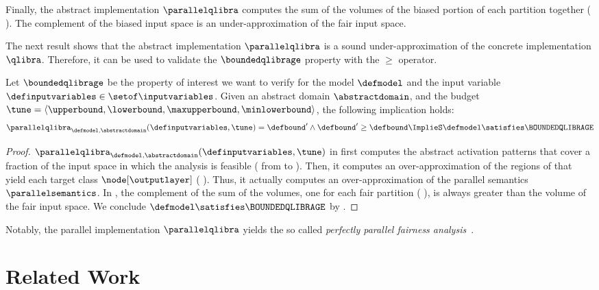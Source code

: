 {Finally, the abstract implementation $\parallelqlibra$ computes the sum of the volumes of the biased portion of each partition together (\cf{} ).
The complement of the biased input space is an under-approximation of the fair input space.

The next result shows that the abstract implementation $\parallelqlibra$ is a sound under-approximation of the concrete implementation $\qlibra$.
Therefore, it can be used to validate the $\boundedqlibrage$ property with the $\ge$ operator.

\begin{theorem}
  Let $\boundedqlibrage$ be the property of interest we want to verify for the model $\defmodel$ and the input variable $\definputvariables\in\setof\inputvariables$.
  Given an abstract domain $\abstractdomain$, and the budget $\tune = \langle \upperbound, \lowerbound, \maxupperbound, \minlowerbound\rangle$, the following implication holds:
  \begin{align*}
    \parallelqlibra_{\defmodel, \abstractdomain}(\definputvariables, \tune) = \defbound' \land \defbound' \ge \defbound \ImplieS \defmodel \satisfies \BOUNDEDQLIBRAGE
  \end{align*}
\end{theorem}
\begin{proof}
  $\parallelqlibra_{\defmodel, \abstractdomain}(\definputvariables, \tune)$ in  first computes the abstract activation patterns that cover a fraction \C{} of the input space in which the analysis is feasible (\cf{} from  to ).
  Then, it computes an over-approximation of the regions of \C{} that yield each target class $\node[\outputlayer]$ (\cf{} ).
  Thus, it actually computes an over-approximation of the parallel semantics $\parallelsemantics$.
  In , the complement of the sum of the volumes, one for each fair partition (\cf{} ), is always greater than the volume of the fair input space. We conclude $\defmodel \satisfies \BOUNDEDQLIBRAGE$ by .
\end{proof}

Notably, the parallel implementation $\parallelqlibra$ yields the so called \emph{perfectly parallel fairness analysis}~.

} %

\section{Related Work}

